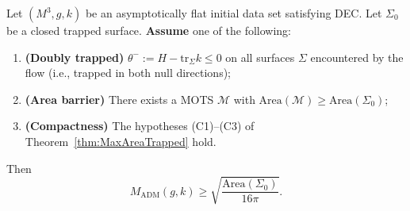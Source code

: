 \begin{theorem}
\label{thm:conditional-penrose}
Let $(M^3, g, k)$ be an asymptotically flat initial data set satisfying DEC. Let $\Sigma_0$ be a closed trapped surface. \textbf{Assume} one of the following:
\begin{enumerate}[label=\textbf{(H\arabic*)}]
\item \textbf{(Doubly trapped)} $\theta^- := H - \mathrm{tr}_\Sigma k \leq 0$ on all surfaces $\Sigma$ encountered by the flow (i.e., trapped in both null directions);
\item \textbf{(Area barrier)} There exists a MOTS $\mathcal{M}$ with $\mathrm{Area}(\mathcal{M}) \geq \mathrm{Area}(\Sigma_0)$;
\item \textbf{(Compactness)} The hypotheses (C1)--(C3) of Theorem~\ref{thm:MaxAreaTrapped} hold.
\end{enumerate}
Then
\begin{equation}
M_{\mathrm{ADM}}(g,k) \geq \sqrt{\frac{\mathrm{Area}(\Sigma_0)}{16\pi}}.
\end{equation}
\end{theorem}

